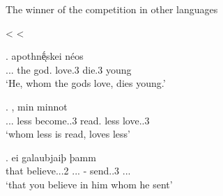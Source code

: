 \documentclass[xcolor=dvipsnames,10pt]{beamer}
\begin{document}
\begin{frame}[t]{The winner of the competition in other languages}

\pause

\center
{} <  < 

\pause

\exg.     apothnḗͅskei néos\\
...\textcolor{LimeGreen}{} the god. love.3\textcolor{LimeGreen}{\scsub{[acc]}} die.3\textcolor{Turquoise}{\scsub{[nom]}} young\\
`He, whom the gods love, dies young.' \label{ex:ag-nom-acc}

\pause

\exg.    , min minnot\\
...\textcolor{red}{} less become..3 read.\textcolor{red}{\scsub{[dat]}} less love..3\textcolor{Turquoise}{\scsub{[nom]}}\\
`whom less is read, loves less' \label{ex:ohg-nom-dat}

\pause

\exg. ei galaubjaiþ þamm   \\
that believe...2\textcolor{red}{\scsub{[dat]}} ...\textcolor{red}{} - {send}..3\textcolor{LimeGreen}{\scsub{[acc]}} ...\\
`that you believe in him whom he sent' \label{ex:gothic-dat-acc}

\end{frame}
\end{document}
